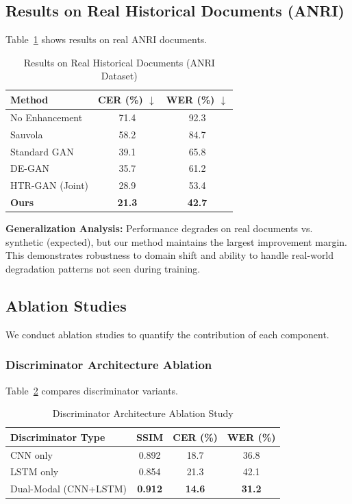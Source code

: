 \documentclass[journal]{IEEEtran}
\begin{document}
\subsection{Results on Real Historical Documents (ANRI)}

Table~\ref{table_anri_results} shows results on real ANRI documents.

\begin{table}[!t]
\renewcommand{\arraystretch}{1.3}
\caption{Results on Real Historical Documents (ANRI Dataset)}
\label{table_anri_results}
\centering
\begin{tabular}{|l|c|c|}
\hline
\textbf{Method} & \textbf{CER (\%) $\downarrow$} & \textbf{WER (\%) $\downarrow$} \\
\hline
No Enhancement & 71.4 & 92.3 \\
Sauvola & 58.2 & 84.7 \\
Standard GAN & 39.1 & 65.8 \\
DE-GAN & 35.7 & 61.2 \\
HTR-GAN (Joint) & 28.9 & 53.4 \\
\textbf{Ours} & \textbf{21.3} & \textbf{42.7} \\
\hline
\end{tabular}
\end{table}

\textbf{Generalization Analysis:}
Performance degrades on real documents vs. synthetic (expected), but our method maintains the largest improvement margin. This demonstrates robustness to domain shift and ability to handle real-world degradation patterns not seen during training.

\subsection{Ablation Studies}

We conduct ablation studies to quantify the contribution of each component.

\subsubsection{Discriminator Architecture Ablation}

Table~\ref{table_ablation_discriminator} compares discriminator variants.

\begin{table}[!t]
\renewcommand{\arraystretch}{1.3}
\caption{Discriminator Architecture Ablation Study}
\label{table_ablation_discriminator}
\centering
\begin{tabular}{|l|c|c|c|}
\hline
\textbf{Discriminator Type} & \textbf{SSIM} & \textbf{CER (\%)} & \textbf{WER (\%)} \\
\hline
CNN only & 0.892 & 18.7 & 36.8 \\
LSTM only & 0.854 & 21.3 & 42.1 \\
Dual-Modal (CNN+LSTM) & \textbf{0.912} & \textbf{14.6} & \textbf{31.2} \\
\hline
\end{tabular}
\end{table}
\end{document}
